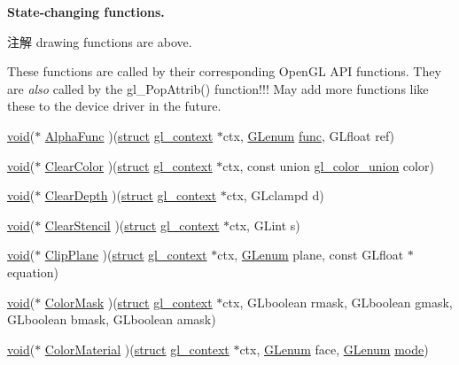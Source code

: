 \begin{Indent}\textbf{ State-\/changing functions.}\par
{\em \begin{DoxyNote}{注解}
drawing functions are above.
\end{DoxyNote}
These functions are called by their corresponding Open\+GL A\+PI functions. They are {\itshape also} called by the gl\+\_\+\+Pop\+Attrib() function!!! May add more functions like these to the device driver in the future. }\begin{DoxyCompactItemize}
\item 
\hyperlink{interfacevoid}{void}($\ast$ \hyperlink{structdd__function__table_acac707afa03c90c474a07ecd73c23ccd}{Alpha\+Func} )(\hyperlink{interfacestruct}{struct} \hyperlink{structgl__context}{gl\+\_\+context} $\ast$ctx, \hyperlink{interfacevoid}{G\+Lenum} \hyperlink{interfacevoid}{func}, G\+Lfloat ref)
\item 
\hyperlink{interfacevoid}{void}($\ast$ \hyperlink{structdd__function__table_ace26dc0dbb18a0787f792fa5144e739a}{Clear\+Color} )(\hyperlink{interfacestruct}{struct} \hyperlink{structgl__context}{gl\+\_\+context} $\ast$ctx, const union \hyperlink{uniongl__color__union}{gl\+\_\+color\+\_\+union} color)
\item 
\hyperlink{interfacevoid}{void}($\ast$ \hyperlink{structdd__function__table_a42f995056022b65949c0021e1d0f5c35}{Clear\+Depth} )(\hyperlink{interfacestruct}{struct} \hyperlink{structgl__context}{gl\+\_\+context} $\ast$ctx, G\+Lclampd d)
\item 
\hyperlink{interfacevoid}{void}($\ast$ \hyperlink{structdd__function__table_ae1cc680b898261ec9a25547884009527}{Clear\+Stencil} )(\hyperlink{interfacestruct}{struct} \hyperlink{structgl__context}{gl\+\_\+context} $\ast$ctx, G\+Lint s)
\item 
\hyperlink{interfacevoid}{void}($\ast$ \hyperlink{structdd__function__table_acc3d4c85478f91446fe80b3f60f923fd}{Clip\+Plane} )(\hyperlink{interfacestruct}{struct} \hyperlink{structgl__context}{gl\+\_\+context} $\ast$ctx, \hyperlink{interfacevoid}{G\+Lenum} plane, const G\+Lfloat $\ast$equation)
\item 
\hyperlink{interfacevoid}{void}($\ast$ \hyperlink{structdd__function__table_a0f4498a49a4045be1ba912ce28caf884}{Color\+Mask} )(\hyperlink{interfacestruct}{struct} \hyperlink{structgl__context}{gl\+\_\+context} $\ast$ctx, G\+Lboolean rmask, G\+Lboolean gmask, G\+Lboolean bmask, G\+Lboolean amask)
\item 
\hyperlink{interfacevoid}{void}($\ast$ \hyperlink{structdd__function__table_a3ae0450c56130763cde4a72bd780485f}{Color\+Material} )(\hyperlink{interfacestruct}{struct} \hyperlink{structgl__context}{gl\+\_\+context} $\ast$ctx, \hyperlink{interfacevoid}{G\+Lenum} face, \hyperlink{interfacevoid}{G\+Lenum} \hyperlink{interfacevoid}{mode})

\end{DoxyCompactItemize}
\end{Indent}
